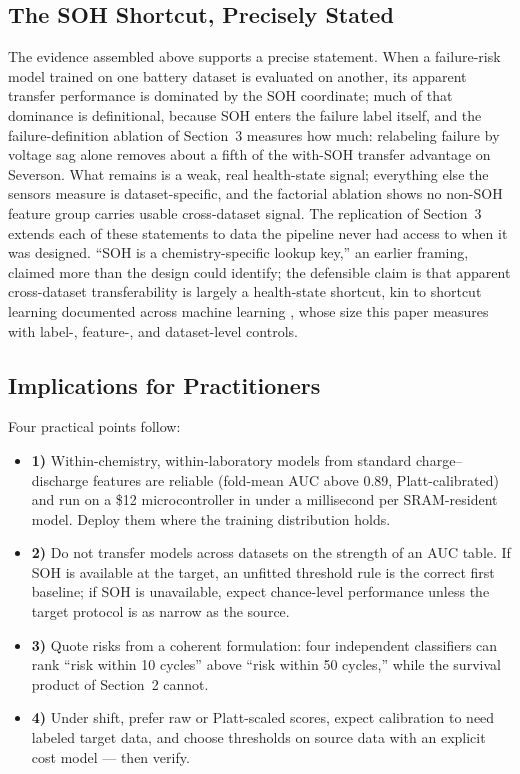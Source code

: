 \documentclass[11pt,a4paper]{article}
\begin{document}
\subsection{The SOH Shortcut, Precisely Stated}
The evidence assembled above supports a precise statement. When a failure-risk model trained on one battery dataset is evaluated on another, its apparent transfer performance is dominated by the SOH coordinate; much of that dominance is definitional, because SOH enters the failure label itself, and the failure-definition ablation of Section~3 measures how much: relabeling failure by voltage sag alone removes about a fifth of the with-SOH transfer advantage on Severson. What remains is a weak, real health-state signal; everything else the sensors measure is dataset-specific, and the factorial ablation shows no non-SOH feature group carries usable cross-dataset signal. The replication of Section~3 extends each of these statements to data the pipeline never had access to when it was designed. ``SOH is a chemistry-specific lookup key,'' an earlier framing, claimed more than the design could identify; the defensible claim is that apparent cross-dataset transferability is largely a health-state shortcut, kin to shortcut learning documented across machine learning \cite{geirhos2020shortcut}, whose size this paper measures with label-, feature-, and dataset-level controls.

\subsection{Implications for Practitioners}
Four practical points follow:
\begin{itemize}
\item \textbf{1)} Within-chemistry, within-laboratory models from standard charge--discharge features are reliable (fold-mean AUC above 0.89, Platt-calibrated) and run on a \$12 microcontroller in under a millisecond per SRAM-resident model. Deploy them where the training distribution holds.
\item \textbf{2)} Do not transfer models across datasets on the strength of an AUC table. If SOH is available at the target, an unfitted threshold rule is the correct first baseline; if SOH is unavailable, expect chance-level performance unless the target protocol is as narrow as the source.
\item \textbf{3)} Quote risks from a coherent formulation: four independent classifiers can rank ``risk within 10 cycles'' above ``risk within 50 cycles,'' while the survival product of Section~2 cannot.
\item \textbf{4)} Under shift, prefer raw or Platt-scaled scores, expect calibration to need labeled target data, and choose thresholds on source data with an explicit cost model --- then verify.
\end{itemize}
\end{document}

